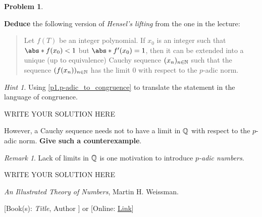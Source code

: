 \documentclass[11pt]{article}
\theoremstyle{plain}
\theoremstyle{definition}
\newtheorem{problem}{Problem}
\theoremstyle{remark}
\newtheorem*{remark}{Remark}
\newtheorem*{hint}{Hint}
\numberwithin{equation}{problem}
\begin{document}
\begin{problem}
\begin{listinprob}[resume]
		\item \textbf{Deduce} the following version of \emph{Hensel's lifting} from the one in the lecture:
		\begin{quote}
			Let $f(T)$ be an integer polynomial. 
			If $x_0$ is an integer such that $\abs*{f(x_0)}<1$ but $\abs*{f'(x_0)}=1$, then it can be extended into a unique (up to equivalence) Cauchy sequence $(x_n)_{n\in\mathbb{N}}$ such that the sequence $(f(x_n))_{n\in\mathbb{N}}$ has the limit $0$ with respect to the $p$-adic norm. 
		\end{quote} 
		\begin{hint}
			Using \cref{p1.p-adic_to_congruence} to translate the statement in the language of congruence.
		\end{hint}
\begin{solution} %
WRITE YOUR SOLUTION HERE
\end{solution}\clearpage %
		\item However, a Cauchy sequence needs not to have a limit in $\mathbb{Q}$ with respect to the $p$-adic norm. 
		\textbf{Give such a counterexample}.
		\begin{remark}
			Lack of limits in $\mathbb{Q}$ is one motivation to introduce \emph{$p$-adic numbers}.
		\end{remark}
\begin{solution} %
WRITE YOUR SOLUTION HERE
\end{solution}\clearpage %
	\end{listinprob}
\end{problem}



\begin{thebibliography}{9}  %
\emph{An Illustrated Theory of Numbers}, Martin H. Weissman.

[Book(s): \emph{Title}, Author ] or [Online: \href{http://example.com/}{Link}]
\end{thebibliography}  %
\end{document}
